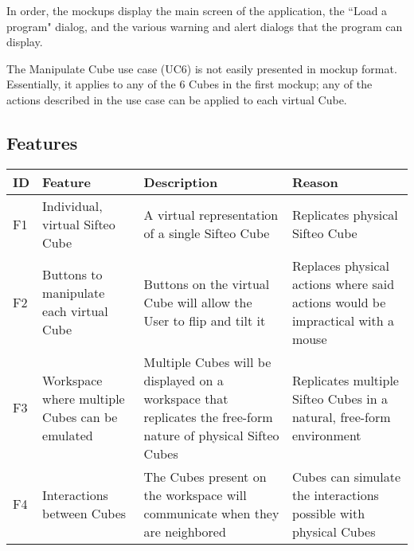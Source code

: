 \documentclass[12pt]{article}
\begin{document}
In order, the mockups display the main screen of the application, the ``Load a program" dialog, and the various warning and alert dialogs that the program can display.

The Manipulate Cube use case (UC6) is not easily presented in mockup format. Essentially, it applies to any of the 6 Cubes in the first mockup; any of the actions described in the use case can be applied to each virtual Cube.



\appendix
    \begin{landscape}
    \section{Features}
    \begin{table}[h!]
      \begin{tabular}{p{.25in} | p{2.75in} | p{3in} | p{3in}}
        \textbf{ID} &
        \textbf{Feature} &
        \textbf{Description} &
        \textbf{Reason} 
        \\ \hline

        F1 &
        Individual, virtual Sifteo Cube &
        A virtual representation of a single Sifteo Cube &
        Replicates physical Sifteo Cube
        \\ \hline

        F2 &
        Buttons to manipulate each virtual Cube &
        Buttons on the virtual Cube will allow the User to flip and tilt it &
        Replaces physical actions where said actions would be impractical with a mouse
        \\ \hline

        F3 &
        Workspace where multiple Cubes can be emulated &
        Multiple Cubes will be displayed on a workspace that replicates the free-form nature of physical Sifteo Cubes\index{Sifteo Cubes} &
        Replicates multiple Sifteo Cubes\index{Sifteo Cubes} in a natural, free-form environment
        \\ \hline

        F4 &
        Interactions between Cubes &
        The Cubes present on the workspace will communicate when they are neighbored &
        Cubes can simulate the interactions possible with physical Cubes
        \\ \hline


\end{tabular}
\end{table}
\end{landscape}
\end{document}
